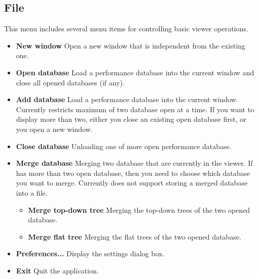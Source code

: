 \documentclass[english]{article}
\begin{document}
\subsection{File}
This menu includes several menu items for controlling basic viewer operations.
\begin{itemize}
\item \textbf{New window}
  Open a new  window that is independent from the existing one.

\item \textbf{Open database}
  Load a performance database into the current  window and close all opened databases (if any). 

\item \textbf{Add database}
  Load a performance database into the current  window. 
  Currently  restricts maximum of two database open at a time. 
  If you want to display more than two, either you close an existing open database first, or you open a new  window.

\item \textbf{Close database}
  Unloading one of more open performance database.

\item \textbf{Merge database}
  Merging two database that are currently in the viewer. If  has more than two
  open database, then you need to choose which database you want to merge.
  Currently  does not support storing a merged database into a file.

  \begin{itemize}
   \item \textbf{Merge top-down tree} Merging the top-down trees of the two opened database.
   \item \textbf{Merge flat tree} Merging the flat trees of the two opened database.
  \end{itemize}

\item \textbf{Preferences...}
  Display the settings dialog box.

\item \textbf{Exit}
  Quit the  application.

\end{itemize}

\end{document}
